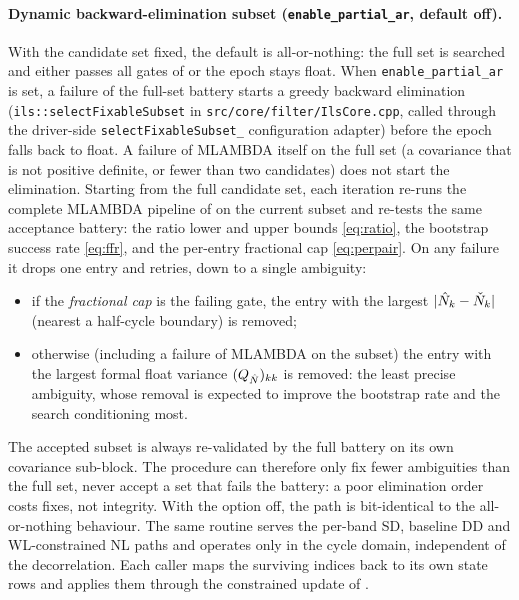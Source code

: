 \documentclass[main.tex]{subfiles}
\begin{document}
\paragraph{Dynamic backward-elimination subset
(\texttt{enable\_partial\_ar}, default off).}
With the candidate set fixed, the default is all-or-nothing: the full
set is searched and either passes all gates of  or
the epoch stays float.  When \texttt{enable\_partial\_ar} is set, a
failure of the full-set battery starts a greedy backward elimination
(\texttt{ils::selectFixableSubset} in
\texttt{src/core/filter/IlsCore.cpp}, called through the driver-side
\texttt{selectFixableSubset\_} configuration adapter) before the epoch
falls back to float.  A failure of \textsc{MLAMBDA} itself on the full
set (a covariance that is not positive definite, or fewer than two
candidates) does not start the elimination.  Starting from the full
candidate set, each iteration re-runs the complete \textsc{MLAMBDA}
pipeline of  on the current subset
and re-tests the same acceptance battery: the ratio lower and upper
bounds \eqref{eq:ratio}, the bootstrap success rate \eqref{eq:ffr}, and
the per-entry fractional cap \eqref{eq:perpair}.  On any failure it
drops one entry and retries, down to a single ambiguity:
\begin{itemize}[leftmargin=*, itemsep=0pt]
\item if the \emph{fractional cap} is the failing gate, the entry with
      the largest $|\hat{N}_k - \check{N}_k|$ (nearest a half-cycle
      boundary) is removed;
\item otherwise (including a failure of \textsc{MLAMBDA} on the subset)
      the entry with the largest formal float variance $(Q_{\hat N})_{kk}$
      is removed: the least precise ambiguity, whose removal is expected
      to improve the bootstrap rate and the search conditioning most.
\end{itemize}
The accepted subset is always re-validated by the full battery on its
own covariance sub-block.  The procedure can therefore only fix fewer
ambiguities than the full set, never accept a set that fails the
battery: a poor elimination order costs fixes, not integrity.  With the
option off, the path is bit-identical to the all-or-nothing behaviour.
The same routine serves the per-band SD, baseline DD and WL-constrained
NL paths and operates only in the cycle domain, independent of the
decorrelation.  Each caller maps the surviving indices back to its own
state rows and applies them through the constrained update of
.
\end{document}
